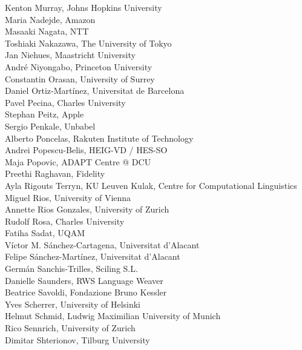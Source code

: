 \documentclass[a4paper,11pt,twoside]{book}
\begin{document}
\noindent Kenton Murray, Johns Hopkins University\\
\noindent Maria Nadejde, Amazon\\
\noindent Masaaki Nagata, NTT\\
\noindent Toshiaki Nakazawa, The University of Tokyo\\
\noindent Jan Niehues, Maastricht University\\
\noindent André Niyongabo, Princeton University\\
\noindent Constantin Orasan, University of Surrey\\
\noindent Daniel Ortiz-Martínez, Universitat de Barcelona\\
\noindent Pavel Pecina, Charles University\\
\noindent Stephan Peitz, Apple\\
\noindent Sergio Penkale, Unbabel\\
\noindent Alberto Poncelas, Rakuten Institute of Technology\\
\noindent Andrei Popescu-Belis, HEIG-VD / HES-SO\\
\noindent Maja Popovic, ADAPT Centre @ DCU\\
\noindent Preethi Raghavan, Fidelity\\
\noindent Ayla Rigouts Terryn, KU Leuven Kulak, Centre for Computational Linguistics\\
\noindent Miguel Rios, University of Vienna\\
\noindent Annette Rios Gonzales, University of Zurich\\
\noindent Rudolf Rosa, Charles University\\
\noindent Fatiha Sadat, UQAM\\
\noindent Víctor M. Sánchez-Cartagena, Universitat d'Alacant\\
\noindent Felipe Sánchez-Martínez, Universitat d'Alacant\\
\noindent Germán Sanchis-Trilles, Sciling S.L.\\
\noindent Danielle Saunders, RWS Language Weaver\\
\noindent Beatrice Savoldi, Fondazione Bruno Kessler\\
\noindent Yves Scherrer, University of Helsinki\\
\noindent Helmut Schmid, Ludwig Maximilian University of Munich\\
\noindent Rico Sennrich, University of Zurich\\
\noindent Dimitar Shterionov, Tilburg University\\
\end{document}
